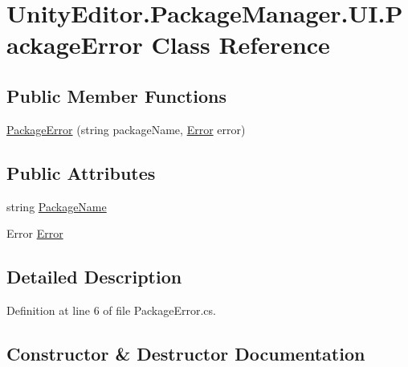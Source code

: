 \hypertarget{class_unity_editor_1_1_package_manager_1_1_u_i_1_1_package_error}{}\section{Unity\+Editor.\+Package\+Manager.\+U\+I.\+Package\+Error Class Reference}
\label{class_unity_editor_1_1_package_manager_1_1_u_i_1_1_package_error}
\subsection*{Public Member Functions}
\begin{DoxyCompactItemize}
\item 
\mbox{\hyperlink{class_unity_editor_1_1_package_manager_1_1_u_i_1_1_package_error_a082eba419191c60e0613fd39fe11e627}{Package\+Error}} (string package\+Name, \mbox{\hyperlink{class_unity_editor_1_1_package_manager_1_1_u_i_1_1_package_error_a7d20592a8a4535b5757ac4254d77bdf5}{Error}} error)
\end{DoxyCompactItemize}
\subsection*{Public Attributes}
\begin{DoxyCompactItemize}
\item 
string \mbox{\hyperlink{class_unity_editor_1_1_package_manager_1_1_u_i_1_1_package_error_abd72df12fe2d47823bcfc232855146b7}{Package\+Name}}
\item 
Error \mbox{\hyperlink{class_unity_editor_1_1_package_manager_1_1_u_i_1_1_package_error_a7d20592a8a4535b5757ac4254d77bdf5}{Error}}
\end{DoxyCompactItemize}


\subsection{Detailed Description}


Definition at line 6 of file Package\+Error.\+cs.



\subsection{Constructor \& Destructor Documentation}
\mbox{\label{class_unity_editor_1_1_package_manager_1_1_u_i_1_1_package_error_a082eba419191c60e0613fd39fe11e627}} 
